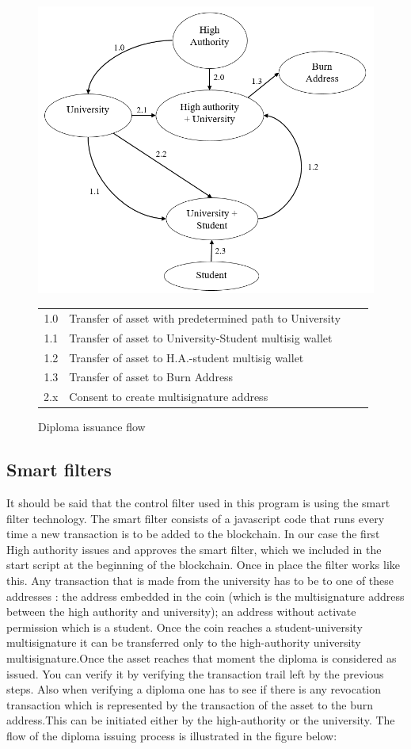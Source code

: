\documentclass[conference]{IEEEtran}
\begin{document}
\begin{figure}[h]
  \includegraphics[width=\linewidth]{diplomaflow.png}
  \caption{Diploma issuance flow}
  \begin{tabular}{r@{: }l r@{: }l}
1.0& Transfer of asset with predetermined path to University\\ 
1.1& Transfer of asset to University-Student multisig wallet\\
1.2& Transfer of asset to H.A.-student multisig wallet \\
1.3& Transfer of asset to Burn Address\\
2.x& Consent to create multisignature address
\end{tabular}
\end{figure}

\subsection{Smart filters}

It should be said that the control filter used in this program is using the smart filter technology. The smart filter consists of a javascript code that runs every time a new transaction is  to be added to the blockchain. In our case the first High authority issues and approves the smart filter, which we included in the start script at the beginning of the blockchain. Once in place the filter works like this. Any transaction that is made from the university has to be to one of these addresses : the address embedded in the coin (which is the multisignature address between the high authority and university); an address without activate permission which is a student. Once the coin reaches a student-university multisignature it can be transferred only to the high-authority university multisignature.Once the asset reaches that moment the diploma is considered as issued. You can verify it by verifying the transaction trail left by the previous steps. Also when verifying a diploma one has to see if there is any revocation transaction which is represented by the transaction of the asset to the burn address.This can be initiated either by the high-authority or the university.
The flow of the diploma issuing process is illustrated in the figure below: 
\end{document}
